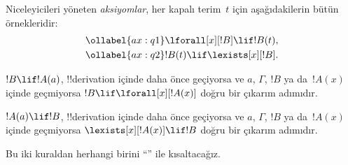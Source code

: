 \documentclass[../../../include/open-logic-section]{subfiles}
\begin{document}


\begin{defn}
Niceleyicileri yöneten \emph{aksiyomlar}, her kapalı terim~$t$ için
aşağıdakilerin bütün örnekleridir:
\begin{align}
\ollabel{ax:q1} & \lforall[x][!B] \lif !B(t), \\
\ollabel{ax:q2} & !B(t) \lif \lexists[x][!B].
\end{align}
\end{defn}

\begin{defn}
\item $!B \lif !A(a)$, !!{derivation} içinde daha önce geçiyorsa ve $a$,
  $\Gamma$, $!B$ ya da~$!A(x)$ içinde geçmiyorsa $!B \lif
  \lforall[x][!A(x)]$ doğru bir çıkarım adımıdır.
\item $!A(a) \lif !B$, !!{derivation} içinde daha önce geçiyorsa ve $a$,
  $\Gamma$, $!B$ ya da~$!A(x)$ içinde geçmiyorsa $\lexists[x][!A(x)] \lif
  !B$ doğru bir çıkarım adımıdır.
\end{defn}

Bu iki kuraldan herhangi birini ``\QR'' ile kısaltacağız.
\end{document}
